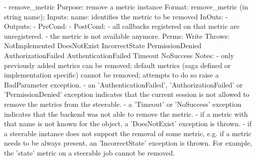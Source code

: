 \begin{myspec}
 
    - remove_metric
      Purpose:  remove a metric instance
      Format:   remove_metric      (in  string  name);
      Inputs:   name:               identifies the metric to be
                                    removed
      InOuts:   -
      Outputs:  -
      PreCond:  -
      PostCond: - all callbacks registered on that metric are
                  unregistered.
                - the metric is not available anymore.
      Perms:    Write
      Throws:   NotImplemented
                DoesNotExist
                IncorrectState
                PermissionDenied
                AuthorizationFailed
                AuthenticationFailed
                Timeout
                NoSuccess
      Notes:    - only previously added metrics can be removed;
                  default metrics (saga defined or implementation
                  specific) cannot be removed; attempts to do so 
                  raise a BadParameter exception.
                - an 'AuthenticationFailed', 
                  'AuthorizationFailed' or 'PermissionDenied'
                  exception indicates that the current session
                  is not allowed to remove the metrics from the 
                  steerable.
                - a 'Timeout' or 'NoSuccess' exception indicates
                  that the backend was not able to remove the 
                  metric.
                - if a metric with that name is not known for
                  the object, a 'DoesNotExist' exception is 
                  thrown.
                - if a steerable instance does not support the
                  removal of some metric, e.g. if a metric
                  needs to be always present, an 
                  'IncorrectState' exception is thrown.  
                  For example, the 'state' metric on a steerable
                  job cannot be removed.
 

\end{myspec}
